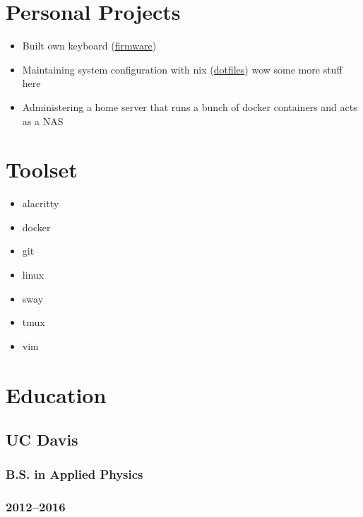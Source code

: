 \documentclass{article}
\begin{document}
\begin{minipage}[t]{.3\textwidth}
\section*{Personal Projects}
\begin{itemize}
    \item Built own keyboard (\href{https://github.com/alejandro-angulo/qmk_firmware/tree/master/keyboards/crkbd/keymaps/alejandro-angulo}{firmware})
    \item Maintaining system configuration with nix (\href{https://github.com/alejandro-angulo/dotfiles/tree/nix-config}{dotfiles}) wow some more stuff here
    \item Administering a home server that runs a bunch of docker containers and acts as a NAS
\end{itemize}
\section*{Toolset}
\begin{itemize}
    \item alacritty
    \item docker
    \item git
    \item linux
    \item sway
    \item tmux
    \item vim
\end{itemize}
\section*{Education}
\subsection*{UC Davis}
\subsubsection*{B.S. in Applied Physics}
\subsubsection*{2012--2016}
\end{minipage}
\end{document}
